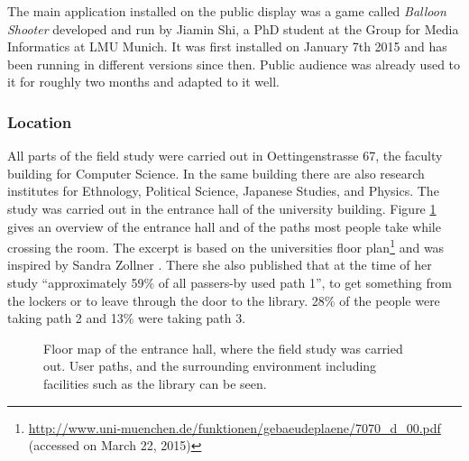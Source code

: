 

		The main application installed on the public display was a game called \textit{Balloon Shooter} developed and run by Jiamin Shi, a PhD student at the Group for Media Informatics at LMU Munich. It was first installed on January 7th 2015 and has been running in different versions since then. Public audience was already used to it for roughly two months and adapted to it well.





	\subsubsection{Location}

	All parts of the field study were carried out in Oettingenstrasse 67, the faculty building for Computer Science. In the same building there are also research institutes for Ethnology, Political Science, Japanese Studies, and Physics. The study was carried out in the entrance hall of the university building. Figure \ref{fig:5-entrance-hall} gives an overview of the entrance hall and of the paths most people take while crossing the room. The excerpt is based on the universities floor plan\footnote{\url{http://www.uni-muenchen.de/funktionen/gebaeudeplaene/7070_d_00.pdf} (accessed on March 22, 2015)} and was inspired by Sandra Zollner \cite{zollner2014thesis}. There she also published that at the time of her study ``approximately 59\% of all passers-by used path 1'', to get something from the lockers or to leave through the door to the library. 28\% of the people were taking path 2 and 13\% were taking path 3.

	\begin{figure}
	    \begin{center}
	    \end{center}
	 \caption[Floor Map of Entrance Hall]{Floor map of the entrance hall, where the field study was carried out. User paths, and the surrounding environment including facilities such as the library can be seen.}
	 \label{fig:5-entrance-hall}
	\end{figure}

